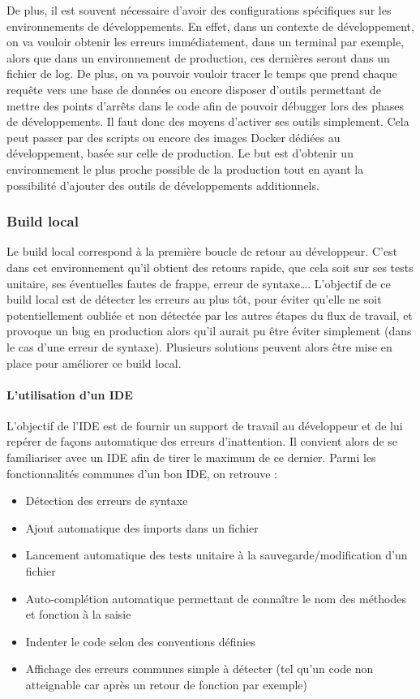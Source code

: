 De plus, il est souvent nécessaire d'avoir des configurations spécifiques sur les environnements de développements. En effet, dans un contexte de développement, on va vouloir obtenir les erreurs immédiatement, dans un terminal par exemple, alors que dans un environnement de production, ces dernières seront dans un fichier de log. De plus, on va pouvoir vouloir tracer le temps que prend chaque requête vers une base de données ou encore disposer d'outils permettant de mettre des points d'arrêts dans le code afin de pouvoir débugger lors des phases de développements. Il faut donc des moyens d'activer ses outils simplement. Cela peut passer par des scripts ou encore des images Docker dédiées au développement, basée sur celle de production. Le but est d'obtenir un environnement le plus proche possible de la production tout en ayant la possibilité d'ajouter des outils de développements additionnels.

\subsubsection{Build local}

Le build local correspond à la première boucle de retour au développeur. C'est dans cet environnement qu'il obtient des retours rapide, que cela soit sur ses tests unitaire, ses éventuelles fautes de frappe, erreur de syntaxe\ldots. L'objectif de ce build local est de détecter les erreurs au plus tôt, pour éviter qu'elle ne soit potentiellement oubliée et non détectée par les autres étapes du flux de travail, et provoque un bug en production alors qu'il aurait pu être éviter simplement (dans le cas d'une erreur de syntaxe). Plusieurs solutions peuvent alors être mise en place pour améliorer ce build local.

\paragraph{L'utilisation d'un \gls{IDE}}

L'objectif de l'\gls{IDE} est de fournir un support de travail au développeur et de lui repérer de façons automatique des erreurs d'inattention. Il convient alors de se familiariser avec un \gls{IDE} afin de tirer le maximum de ce dernier. Parmi les fonctionnalités communes d'un bon \gls{IDE}, on retrouve :

\begin{itemize}
	\setlength\itemsep{-0.5em}
	\item Détection des erreurs de syntaxe
	\item Ajout automatique des imports dans un fichier
	\item Lancement automatique des tests unitaire à la sauvegarde/modification d'un fichier
	\item Auto-complétion automatique permettant de connaître le nom des méthodes et fonction à la saisie
	\item Indenter le code selon des conventions définies
	\item Affichage des erreurs communes simple à détecter (tel qu'un code non atteignable car après un retour de fonction par exemple)
\end{itemize}

